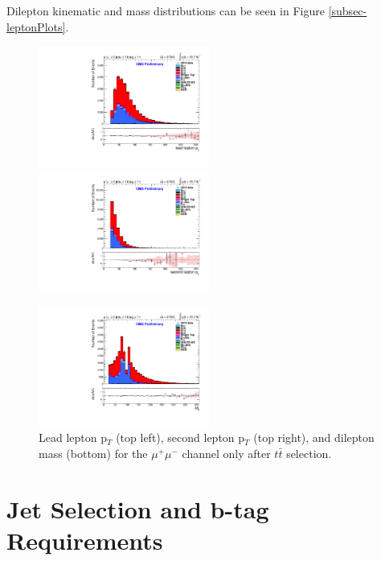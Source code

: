 Dilepton kinematic and mass distributions can be seen in Figure \ref{subsec-leptonPlots}.

\begin{figure}
\includegraphics[width=0.5\textwidth]{Plots/ControlPlots/TTbarDiLeptonAnalysis/MuMu/DiLepton/LeadLepton_Pt_splitTTbar_ratio.pdf}
\includegraphics[width=0.5\textwidth]{Plots/ControlPlots/TTbarDiLeptonAnalysis/MuMu/DiLepton/SecondLepton_Pt_splitTTbar_ratio.pdf}\\
\begin{center}
\includegraphics[width=0.5\textwidth]{Plots/ControlPlots/TTbarDiLeptonAnalysis/MuMu/DiLepton/diLepton_Mass_splitTTbar_ratio.pdf}
\end{center}
\caption{Lead lepton p$_T$ (top left), second lepton p$_T$ (top right), and dilepton mass (bottom) for the $\mu^{+}\mu^{-}$ channel only after $t\bar{t}$ selection.}
\label{fig-leptonPlots}
\end{figure}

\section{Jet Selection and b-tag Requirements} \label{sec-JetSelection}

